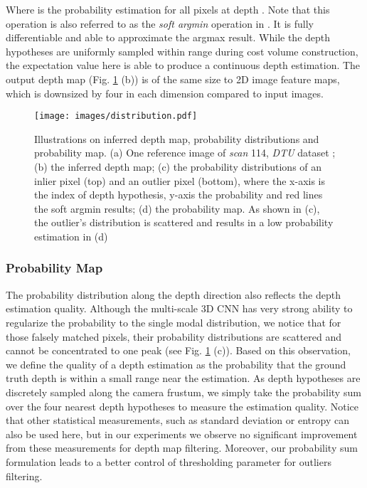 \documentclass[runningheads]{llncs}
\begin{document}
Where  is the probability estimation for all pixels at depth . Note that this operation is also referred to as the \textit{soft argmin} operation in \cite{kendall2017end}. It is fully differentiable and able to approximate the argmax result. While the depth hypotheses are uniformly sampled within range  during cost volume construction, the expectation value here is able to produce a continuous depth estimation. The output depth map (Fig. \ref{fig:distribution} (b)) is of the same size to 2D image feature maps, which is downsized by four in each dimension compared to input images.

\begin{figure}[t!]
  \centering
  \texttt{[image: images/distribution.pdf]}
  \caption{Illustrations on inferred depth map, probability distributions and probability map. (a) One reference image of \textit{scan} 114, \textit{DTU} dataset \cite{aanaes2016large}; (b) the inferred depth map; (c) the probability distributions of an inlier pixel (top) and an outlier pixel (bottom), where the x-axis is the index of depth hypothesis, y-axis the probability and red lines the soft argmin results; (d) the probability map. As shown in (c), the outlier's distribution is scattered and results in a low probability estimation in (d)}
  \label{fig:distribution}
\end{figure}

\vspace{-3mm}
\subsubsection{Probability Map}\label{sec:quality} The probability distribution along the depth direction also reflects the depth estimation quality. Although the multi-scale 3D CNN has very strong ability to regularize the probability to the single modal distribution, we notice that for those falsely matched pixels, their probability distributions are scattered and cannot be concentrated to one peak (see Fig. \ref{fig:distribution} (c)). Based on this observation, we define the quality of a depth estimation  as the probability that the ground truth depth is within a small range near the estimation. As depth hypotheses are discretely sampled along the camera frustum, we simply take the probability sum over the four nearest depth hypotheses to measure the estimation quality. Notice that other statistical measurements, such as standard deviation or entropy can also be used here, but in our experiments we observe no significant improvement from these measurements for depth map filtering. Moreover, our probability sum formulation leads to a better control of thresholding parameter for outliers filtering. 
\end{document}
